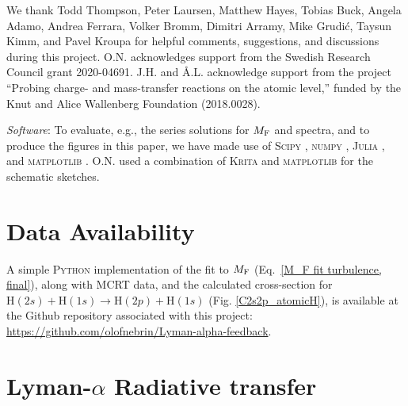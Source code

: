 \documentclass[fleqn,usenatbib]{mnras}
\begin{document}
We thank Todd Thompson, Peter Laursen, Matthew Hayes, Tobias Buck, Angela Adamo, Andrea Ferrara, Volker Bromm, Dimitri Arramy, Mike Grudić, Taysun Kimm, and Pavel Kroupa for helpful comments, suggestions, and discussions during this project. O.N. acknowledges support
from the Swedish Research Council grant 2020-04691. J.H. and Å.L. acknowledge support from the project “Probing charge- and mass-transfer reactions on the atomic
level,” funded by the Knut and Alice Wallenberg Foundation
(2018.0028).

\textit{Software}: To evaluate, e.g., the series solutions for $M_{\rm F}$ and spectra, and to produce the figures in this paper, we have made use of \textsc{Scipy} \citep{Virtanen2020_Scipy}, \textsc{numpy} \citep{Harris2020_Numpy}, \textsc{Julia} \citep{Julia2017}, and \textsc{matplotlib} \citep{Hunter2007_matplotlib}. O.N. used a combination of \textsc{Krita} and \textsc{matplotlib} for the schematic sketches.


\section*{Data Availability}
A simple \textsc{Python} implementation of the fit to $M_{\rm F}$ (Eq.~\ref{M_F fit turbulence, final}), along with MCRT data, and the calculated cross-section for $\textrm{H}(2s)+\textrm{H}(1s) \rightarrow \textrm{H}(2p)+\textrm{H}(1s)$ (Fig. \ref{C2s2p_atomicH}), is available at the Github repository associated with this project: \url{https://github.com/olofnebrin/Lyman-alpha-feedback}. 




%





\appendix
\onecolumn

\section{Lyman-\texorpdfstring{\boldmath$\alpha$}{alpha} Radiative transfer}
\end{document}
